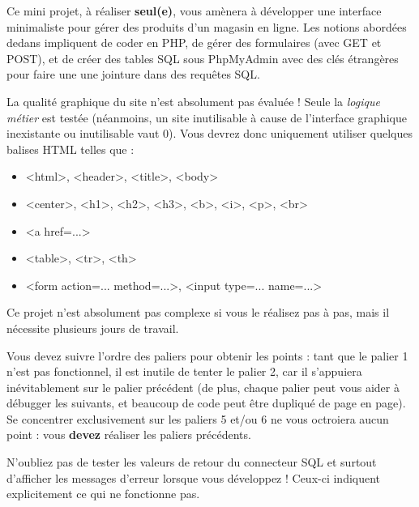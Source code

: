 

\vspace*{0.7cm}

\noindent {}

\bigskip

\noindent Ce mini projet, à réaliser \textbf{seul(e)}, vous amènera à développer une interface minimaliste pour gérer des produits d'un magasin en ligne.
Les notions abordées dedans impliquent de coder en PHP, de gérer des formulaires (avec GET et POST), et de créer des tables SQL sous PhpMyAdmin avec des clés étrangères pour faire une une jointure dans des requêtes SQL.

\bigskip

\noindent La qualité graphique du site n'est absolument pas évaluée !
Seule la \textit{logique métier} est testée (néanmoins, un site inutilisable à cause de l'interface graphique inexistante ou inutilisable vaut 0).
Vous devrez donc uniquement utiliser quelques balises HTML telles que :

\medskip

\begin{itemize}
\item <html>, <header>, <title>, <body>
\item <center>, <h1>, <h2>, <h3>, <b>, <i>, <p>, <br>
\item <a href=...>
\item <table>, <tr>, <th>
\item <form action=... method=...>, <input type=... name=...>
\end{itemize}

\bigskip

\noindent Ce projet n'est absolument pas complexe si vous le réalisez pas à pas, mais il nécessite plusieurs jours de travail.

\medskip

\noindent Vous devez suivre l'ordre des paliers pour obtenir les points : tant que le palier 1 n'est pas fonctionnel, il est inutile de tenter le palier 2, car il s'appuiera inévitablement sur le palier précédent (de plus, chaque palier peut vous aider à débugger les suivants, et beaucoup de code peut être dupliqué de page en page).
Se concentrer exclusivement sur les paliers 5 et/ou 6 ne vous octroiera aucun point : vous \textbf{devez} réaliser les paliers précédents.

\medskip

\noindent N'oubliez pas de tester les valeurs de retour du connecteur SQL et surtout d'afficher les messages d'erreur lorsque vous développez !
Ceux-ci indiquent explicitement ce qui ne fonctionne pas.
